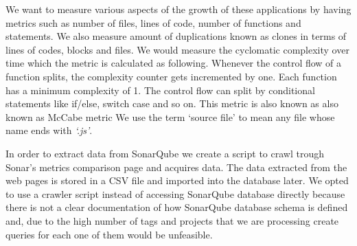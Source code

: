 \par
We want to measure various aspects of the growth of these applications by having metrics such as number of files, lines of code, number of functions and statements. We also measure amount of duplications known as clones in terms of lines of codes, blocks and files. We would measure the cyclomatic complexity over time which the metric is calculated as following. Whenever the control flow of a function splits, the complexity counter gets incremented by one. Each function has a minimum complexity of 1. The control flow can split by conditional statements like if/else, switch case and so on. This metric is also known as also known as McCabe metric
We use the term `source file' to mean any file whose name ends with \textit{`.js'}.

In order to extract data from SonarQube we create a script to crawl trough Sonar's metrics comparison page and acquires data. The data extracted from the web pages is stored in a CSV file and imported into the database later. We opted to use a crawler script instead of accessing SonarQube database directly because there is not a clear documentation of how SonarQube database schema is defined and, due to the high number of tags and projects that we are processing create queries for each one of them would be unfeasible. 

